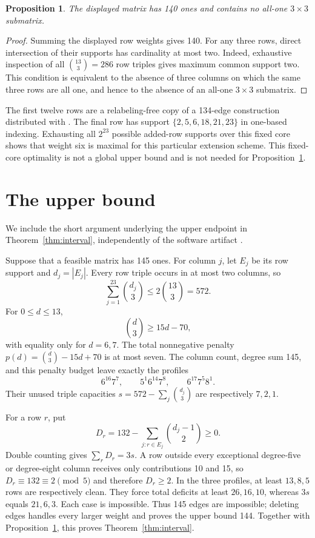 \documentclass[11pt]{article}
\newtheorem{proposition}{Proposition}
\begin{document}
\begin{proposition}\label{prop:witness}
The displayed matrix has 140 ones and contains no all-one $3\times3$
submatrix.
\end{proposition}

\begin{proof}
Summing the displayed row weights gives 140. For any three rows, direct
intersection of their supports has cardinality at most two. Indeed, exhaustive
inspection of all $\binom{13}{3}=286$ row triples gives maximum common support
two. This condition is equivalent to the absence of three columns on which
the same three rows are all one, and hence to the absence of an all-one
$3\times3$ submatrix.
\end{proof}

The first twelve rows are a relabeling-free copy of a 134-edge construction
distributed with \cite{FiniteZarankiewiczClosures2026}. The final row has support
$\{2,5,6,18,21,23\}$ in one-based indexing. Exhausting all $2^{23}$ possible
added-row supports over this fixed core shows that weight six is maximal for
this particular extension scheme. This fixed-core optimality is not a global
upper bound and is not needed for Proposition~\ref{prop:witness}.

\section{The upper bound}
We include the short argument underlying the upper endpoint in
Theorem~\ref{thm:interval}, independently of the software artifact
\cite{FiniteZarankiewiczClosures2026}.

Suppose that a feasible matrix has 145 ones. For column $j$, let $E_j$ be its
row support and $d_j=|E_j|$. Every row triple occurs in at most two columns, so
\begin{equation}\label{eq:capacity}
\sum_{j=1}^{23}\binom{d_j}{3}\le2\binom{13}{3}=572.
\end{equation}
For $0\le d\le13$,
\[
\binom d3\ge15d-70,
\]
with equality only for $d=6,7$. The total nonnegative penalty
$p(d)=\binom d3-15d+70$ is at most seven. The column count, degree sum 145,
and this penalty budget leave exactly the profiles
\[
6^{16}7^7,\qquad 5^1 6^{14}7^8,\qquad 6^{17}7^5 8^1.
\]
Their unused triple capacities
$s=572-\sum_j\binom{d_j}{3}$ are respectively $7,2,1$.

For a row $r$, put
\[
D_r=132-\sum_{j:r\in E_j}\binom{d_j-1}{2}\ge0.
\]
Double counting gives $\sum_rD_r=3s$. A row outside every exceptional
degree-five or degree-eight column receives only contributions 10 and 15, so
$D_r\equiv132\equiv2\pmod5$ and therefore $D_r\ge2$. In the three profiles,
at least $13,8,5$ rows are respectively clean. They force total deficits at
least $26,16,10$, whereas $3s$ equals $21,6,3$. Each case is impossible.
Thus 145 edges are impossible; deleting edges handles every larger weight and
proves the upper bound 144. Together with Proposition~\ref{prop:witness}, this
proves Theorem~\ref{thm:interval}.
\end{document}
